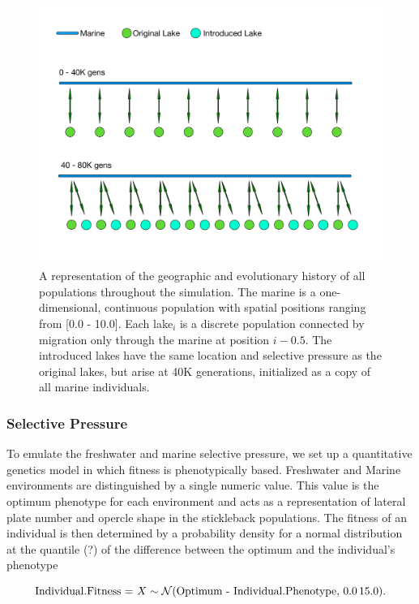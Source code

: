 \documentclass{article}
\begin{document}
\begin{figure}[htb]
	\begin{center}
  		\includegraphics[width=0.8\linewidth]{GeographyDiagram}
  		\caption{A representation of the geographic and evolutionary history of all populations throughout the simulation. 
		The marine is a one-dimensional, continuous population with spatial positions ranging from [0.0 - 10.0]. Each 
		lake$_{i}$ is a discrete population connected by migration only through the marine at position $i - 0.5$. The introduced lakes 
		have the same location and selective pressure as the original lakes, but arise at 40K generations, 
		initialized as a copy of all marine individuals.}
  		\label{fig:Geo}
	\end{center}
\end{figure}

\subsubsection{Selective Pressure}

To emulate the freshwater and marine selective pressure, 
we set up a quantitative genetics model in which fitness is phenotypically based. 
Freshwater and Marine environments are distinguished by a single numeric value. 
This value is the optimum phenotype for each environment
and acts as a representation of lateral plate number and opercle shape in the stickleback populations.
The fitness of an individual is then determined by a probability density for a normal distribution 
at the quantile (?) of the difference between the optimum and the individual's phenotype


    \[
\textnormal{Individual.Fitness = } X \sim \mathcal{N}(\textnormal{Optimum - Individual.Phenotype},\,0.0\,15.0).
    \]
\end{document}

